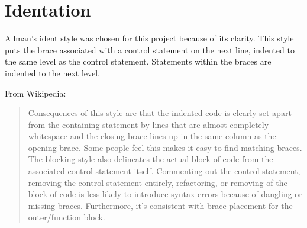 %
%

%
%
%
%

\section{Identation}
  Allman's ident style was chosen for this project because of its clarity. 
  This style puts the brace associated with a control statement on the next 
  line, indented to the same level as the control statement. Statements within 
  the braces are indented to the next level.
  
  
  \clearpage
  
  From Wikipedia:
  
  \begin{quote}
  Consequences of this style are that the indented code is clearly set apart 
  from the containing statement by lines that are almost completely whitespace 
  and the closing brace lines up in the same column as the opening brace. Some 
  people feel this makes it easy to find matching braces. The blocking style 
  also delineates the actual block of code from the associated control 
  statement itself. Commenting out the control statement, removing the control 
  statement entirely, refactoring, or removing of the block of code is less 
  likely to introduce syntax errors because of dangling or missing braces. 
  Furthermore, it's consistent with brace placement for the outer/function 
  block.\cite{noauthor_indent_2017}
  \end{quote}

